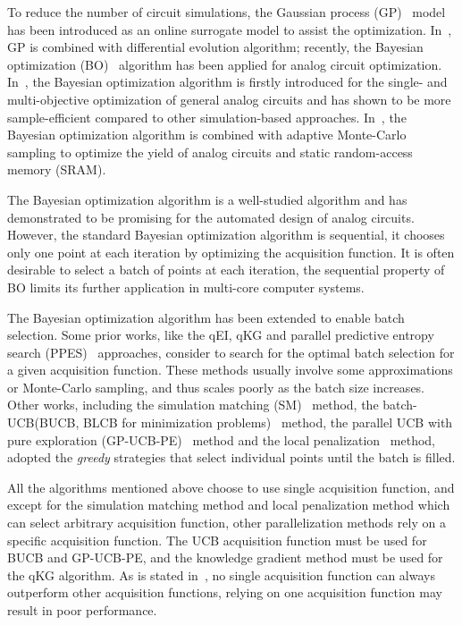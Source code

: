 %
To reduce the number of circuit simulations, the Gaussian process
(GP)~\cite{GPML} model has been introduced as an online surrogate model to
assist the optimization. In~\cite{liu2014gaspad}, GP is combined with
differential evolution algorithm; recently, the
Bayesian optimization (BO)~\cite{shahriari2016taking} algorithm has been
applied for analog circuit optimization. In~\cite{lyu2017efficient}, the Bayesian optimization algorithm is
firstly introduced for the single- and multi-objective optimization of general analog circuits and has
shown to be more sample-efficient compared to other simulation-based
approaches. In~\cite{wang2017efficient}, the Bayesian optimization algorithm
is combined with adaptive Monte-Carlo sampling to optimize the yield of analog
circuits and static random-access memory (SRAM).

The Bayesian optimization algorithm is a well-studied algorithm and has
demonstrated to be promising for the automated design of analog circuits.
However, the standard Bayesian optimization algorithm is sequential, it chooses
only one point at each iteration by optimizing the acquisition function. It is
often desirable to select a batch of points at each iteration, the sequential
property of BO limits its further application in multi-core computer systems.

The Bayesian optimization algorithm has been extended to enable batch
selection. Some prior works, like the qEI\cite{qEI}, qKG\cite{wu2016parallel}
and parallel predictive entropy search (PPES)~\cite{shah2015parallel}
approaches, consider to search for the optimal batch selection for a given
acquisition function. These methods usually involve some approximations or
Monte-Carlo sampling, and thus scales poorly as the batch size increases. Other
works, including the simulation matching (SM)~\cite{azimi2010batch} method, the
batch-UCB(BUCB, BLCB for minimization
problems)~\cite{desautels2014parallelizing} method, the parallel UCB with pure
exploration (GP-UCB-PE)~\cite{contal2013parallel} method and the local
penalization~\cite{gonzalez2016batch} method, adopted the \emph{greedy}
strategies that select individual points until the batch is filled.

All the algorithms mentioned above choose to use single acquisition function,
and except for the simulation matching method and local penalization method
which can select arbitrary acquisition function, other parallelization methods
rely on a specific acquisition function. The UCB acquisition function must be
used for BUCB and GP-UCB-PE, and the knowledge gradient method must be used for
the qKG algorithm. As is stated in~\cite{hoffman2011portfolio}, no single
acquisition function can always outperform other acquisition functions, relying
on one acquisition function may result in poor performance. 

